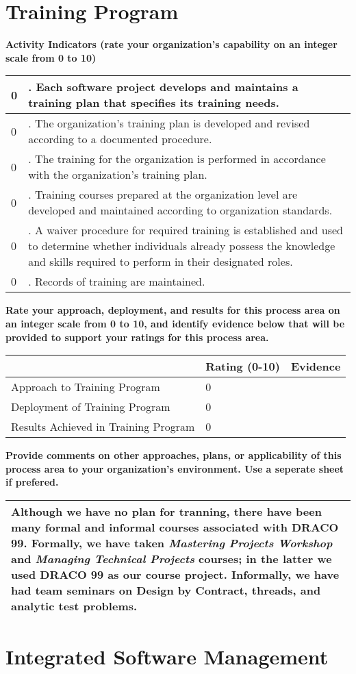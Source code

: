 \documentclass{article}
\newcommand{\KPAname}{}
\let\KPAsection=\section
\renewcommand{\section}[1]{\renewcommand{\KPAname}{#1}\KPAsection{#1}}
\newcounter{activity}		%
\newenvironment{KPAActivity}
{
    \setcounter{activity}{0} %
    {\bf Activity Indicators (rate your organization's capability
    on an integer scale from 0 to 10)} %
    \begin{center}
    \begin{tabular}{|p{0.5in}|p{6.0in}|} \hline %
}
{
    \end{tabular}
    \end{center}
}
\newcommand{\Activity}[2]
{
    \stepcounter{activity} #1 & \arabic{activity}. #2 \\ \hline
} %
\newenvironment{KPARate}
{
    {\bf Rate your approach, deployment, and results for
    this process area on an integer scale from 0 to 10, and 
    identify evidence below that will be provided to support your
    ratings for this process area.}
    \begin{center}
    \begin{tabular}{|p{1.0in}|p{0.5in}|p{5.0in}|} \hline
    & Rating (0-10) & \multicolumn{1}{c|}{Evidence} \\ \hline
}
{
    \end{tabular}
    \end{center}
}
\newcommand{\Approach}[2]{Approach to \KPAname & #1 & #2 \\ \hline}
\newcommand{\Deployment}[2]{Deployment of \KPAname & #1 & #2 \\ \hline}
\newcommand{\Results}[2]{Results Achieved in \KPAname & #1 & #2 \\
	\hline}
\newenvironment{KPAComment}
{
    {\bf Provide comments on other approaches, plans,
    or applicability of this process area to your organization's
    environment.  Use a seperate sheet if prefered.}
    \begin{center}
    \begin{tabular}{|p{6.50in}|} \hline
}
{
    \\ \hline
    \end{tabular}
    \end{center}
}
\begin{document}
\newpage
\section{Training Program}

\begin{KPAActivity}
\Activity{0}{Each software project develops and maintains a training
plan that specifies its training needs.}
\Activity{0}{The organization's training plan is developed and
revised according to a documented procedure.}
\Activity{0}{The training for the organization is performed in
accordance with the organization's training plan.}
\Activity{0}{Training courses prepared at the organization level are
developed and maintained according to organization standards.}
\Activity{0}{A waiver procedure for required training is established
and used to determine whether individuals already possess the
knowledge and skills required to perform in their designated roles.}
\Activity{0}{Records of training are maintained.}
\end{KPAActivity}

\begin{KPARate}
\Approach{0}{}
\Deployment{0}{}
\Results{0}{}
\end{KPARate}

\begin{KPAComment}
Although we have no plan for tranning, there have been many formal and
informal courses associated with DRACO 99.  Formally, we have taken
{\em Mastering Projects Workshop} and {\em Managing Technical
Projects} courses; in the latter we used DRACO 99 as our course
project.  Informally, we have had team seminars on Design by Contract,
threads, and analytic test problems.
\end{KPAComment}
\newpage
\section{Integrated Software Management}
\end{document}
